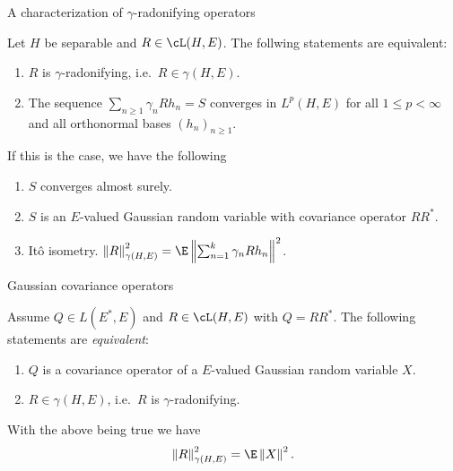 \begin{frame}
    {A characterization of $\gamma$-radonifying operators}
    
    \begin{theorem}
        Let $H$ be separable and $R\in\cL(H,E)$. The follwing statements are equivalent:
        \begin{enumerate}
            \item $R$ is $\gamma$-radonifying, i.e.\ $R\in \gamma(H,E)$. 
            \item The sequence
                    $\sum_{n \geq 1}^{} \gamma_n R h_n = S $
                converges in $L^p(H,E)$ for all $1 \leq p < \infty$ and all
                orthonormal bases $\left( h_n \right)_{n \geq 1}$.
        \end{enumerate}
        If this is the case, we have the following
        \begin{enumerate}
            \item $S$ converges almost surely.
            \item $S$ is an $E$-valued Gaussian random variable with covariance 
                operator $R R^{*}$.
            \item It\^o isometry. 
                $\left\| R \right\|^2_{\gamma(H,E)} = 
                \E \left\| \sum_{n=1}^{k} \gamma_n R h_n  \right\|^2$.
        \end{enumerate}
    \end{theorem}
\end{frame}


\begin{frame}
    {Gaussian covariance operators}
    
    Assume $Q\in L(E^*, E)$ and $R\in \cL(H,E)$ with $Q = R R^{*}$. The 
    following statements are \emph{equivalent}:
    \begin{enumerate}
        \item $Q$ is a covariance operator of a $E$-valued Gaussian random variable $X$. 
        \item $R \in \gamma(H,E)$, i.e.\ $R$ is $\gamma$-radonifying.
    \end{enumerate}
    With the above being true we have 
    \begin{equation*}
        \left\| R \right\|_{\gamma(H,E)}^2 = \E \left\| X\right\|^2.
    \end{equation*}
\end{frame}


